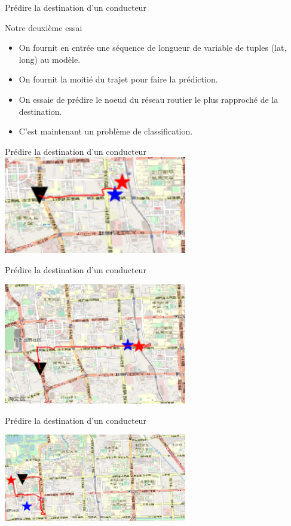 \documentclass[aspectratio=169]{beamer}
\begin{document}
\begin{frame}{Prédire la destination d'un conducteur}

{\Large Notre deuxième essai}

\begin{itemize}
	\item On fournit en entrée une séquence de longueur de variable de tuples (lat, long) au modèle.
	\item On fournit la moitié du trajet pour faire la prédiction.
	\item On essaie de prédire le noeud du réseau routier le plus rapproché de la destination.
	\item C'est maintenant un problème de classification.
\end{itemize}
\end{frame}

\begin{frame}{Prédire la destination d'un conducteur}
\centering
\includegraphics[width=0.6\textwidth]{figures/ex1_clf}
\end{frame}

\begin{frame}{Prédire la destination d'un conducteur}
\centering

\includegraphics[width=0.6\textwidth]{figures/ex2_clf}
\end{frame}

\begin{frame}{Prédire la destination d'un conducteur}
\centering

\includegraphics[width=0.6\textwidth]{figures/ex3_clf}
\end{frame}
\end{document}
